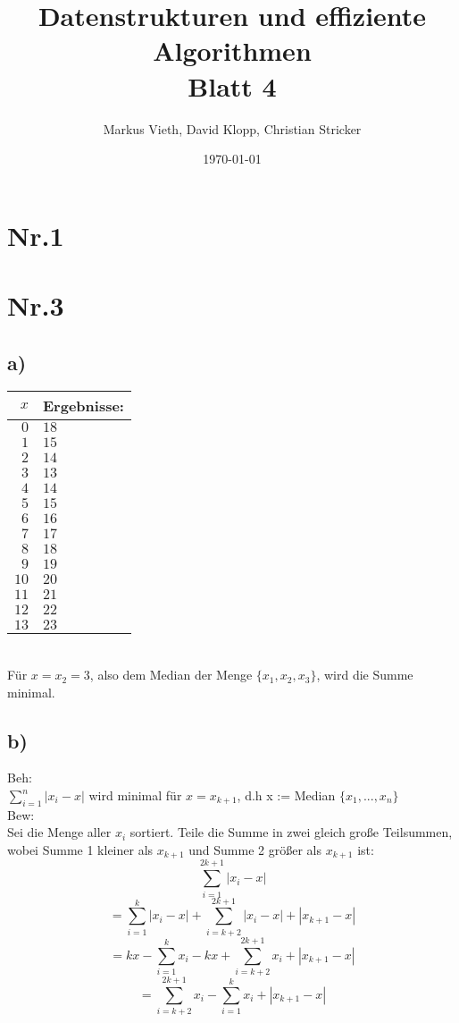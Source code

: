 \documentclass[a4paper,11pt,twoside]{article}
\title{Datenstrukturen und effiziente Algorithmen\\ Blatt 4}
\author{Markus Vieth, David Klopp, Christian Stricker}
\date{\today}
\begin{document}
\maketitle
\cleardoublepage
\pagestyle{myheadings}

\section*{Nr.1}


\section*{Nr.3}
\subsection*{a)}
\begin{tabular}{r|l}
	$x$ & Ergebnisse: \\ \hline
	$0$&$18$\\
	$1$&$15$\\
	$2$&$14$\\
	$3$&$13$\\
	$4$&$14$\\
	$5$&$15$\\
	$6$&$16$\\
	$7$&$17$\\
	$8$&$18$\\
	$9$&$19$\\
	$10$&$20$\\
	$11$&$21$\\
	$12$&$22$\\
	$13$&$23$
\end{tabular} \\

Für $x=x_2=3$, also dem Median der Menge $\{x_1, x_2, x_3\}$, wird die Summe minimal.

\pagebreak

\subsection*{b)}

Beh:\\ $\sum_{i=1}^{n} |x_i-x|$ wird minimal für $x = x_{k+1}$, d.h x := Median $\{x_1, ..., x_n\}$\\

Bew: \\
Sei die Menge aller $x_i$ sortiert. Teile die Summe in zwei gleich große Teilsummen, wobei Summe 1 kleiner als $x_{k+1}$ und Summe 2 größer als $x_{k+1} $ ist:
\[\sum_{i=1}^{2k+1}|x_i-x|\]
\[= \sum_{i=1}^{k}|x_i-x| + \sum_{i=k+2}^{2k+1}|x_i-x| + |x_{k+1}-x|\]
\[= kx - \sum_{i=1}^{k}x_i -kx+ \sum_{i=k+2}^{2k+1}x_i + |x_{k+1}-x|\]
\[= \sum_{i=k+2}^{2k+1}x_i - \sum_{i=1}^{k}x_i + |x_{k+1}-x|\]\\
\end{document}
